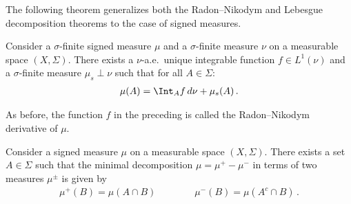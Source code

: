 
    The following theorem generalizes both the Radon--Nikodym and Lebesgue decomposition theorems to the case of signed measures.
    \begin{theorem}\label{measure:signed_radon_nikodym}
        Consider a $\sigma$-finite signed measure $\mu$ and a $\sigma$-finite measure $\nu$ on a measurable space $(X,\Sigma)$. There exists a $\nu$-a.e.~unique integrable function $f\in L^1(\nu)$ and a $\sigma$-finite measure $\mu_s\perp\nu$ such that for all $A\in\Sigma$:
        \begin{gather}
            \mu(A) = \Int_Af\,d\nu + \mu_s(A)\,.
        \end{gather}
    \end{theorem}
    As before, the function $f$ in the preceding is called the Radon--Nikodym derivative of $\mu$.

    \begin{theorem}
        Consider a signed measure $\mu$ on a measurable space $(X,\Sigma)$. There exists a set $A\in\Sigma$ such that the minimal decomposition $\mu=\mu^+-\mu^-$ in terms of two measures $\mu^\pm$ is given by
        \begin{gather}
            \mu^+(B) = \mu(A\cap B)\qquad\qquad\mu^-(B)=\mu(A^c\cap B)\,.
        \end{gather}
    \end{theorem}

